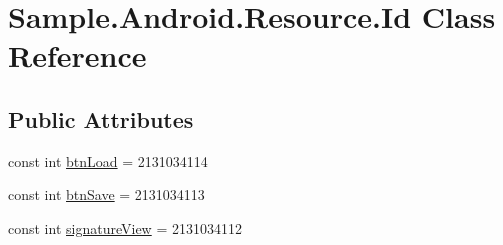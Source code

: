\hypertarget{class_sample_1_1_android_1_1_resource_1_1_id}{\section{Sample.\+Android.\+Resource.\+Id Class Reference}
\label{class_sample_1_1_android_1_1_resource_1_1_id}
}
\subsection*{Public Attributes}
\begin{DoxyCompactItemize}
\item 
const int \hyperlink{class_sample_1_1_android_1_1_resource_1_1_id_a873e8ab856b0b0c4d9ee293f6cca389c}{btn\+Load} = 2131034114
\item 
const int \hyperlink{class_sample_1_1_android_1_1_resource_1_1_id_a31c70aa1efe666f624c7b87afccd24be}{btn\+Save} = 2131034113
\item 
const int \hyperlink{class_sample_1_1_android_1_1_resource_1_1_id_af6df959e12d198ba5375f6c40205c226}{signature\+View} = 2131034112
\end{DoxyCompactItemize}



